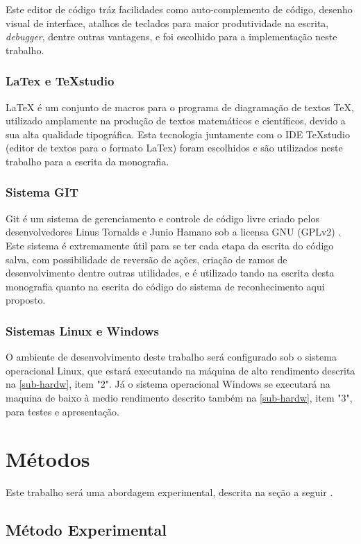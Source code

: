 Este editor de código tráz facilidades como auto-complemento de código, desenho visual de interface, atalhos de teclados para maior produtividade na escrita, \textit{debugger}, dentre outras vantagens, e foi escolhido para a implementação neste trabalho.

\subsubsection{LaTex e TeXstudio}\label{subsec:latex}
LaTeX é um conjunto de macros para o programa de diagramação de textos TeX, utilizado amplamente na produção de textos matemáticos e científicos, devido a sua alta qualidade tipográfica. Esta tecnologia juntamente com o IDE TeXstudio (editor de textos para o formato LaTex) foram escolhidos e são utilizados neste trabalho para a escrita da monografia.

\subsubsection{Sistema GIT}\label{subsec:git}
Git é um sistema de gerenciamento e controle de código livre criado pelos desenvolvedores Linus Tornalds e Junio Hamano sob a licensa GNU (GPLv2) \cite{git}. Este sistema é extremamente útil para se ter cada etapa da escrita do código salva, com possibilidade de reversão de ações, criação de ramos de desenvolvimento dentre outras utilidades, e é utilizado tando na escrita desta monografia quanto na escrita do código do sistema de reconhecimento aqui proposto.

\subsubsection{Sistemas Linux e Windows}\label{subsec:linux}
O ambiente de desenvolvimento deste trabalho será configurado sob o sistema operacional Linux, que estará executando na máquina de alto rendimento descrita na \autoref{sub-hardw}, item "2". Já o sistema operacional Windows se executará na maquina de baixo à medio rendimento descrito também na \autoref{sub-hardw}, item "3", para testes e apresentação.


\section{Métodos}\label{sec:metodos}
Este trabalho será uma abordagem experimental, descrita na seção a seguir \cite{fachin-metodos}.


\subsection{Método Experimental}

